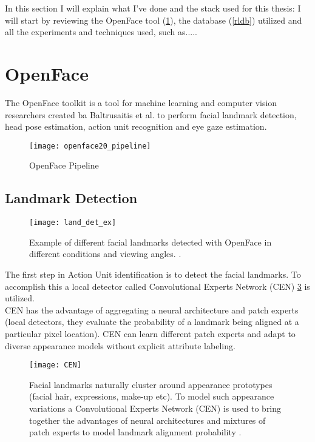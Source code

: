 In this section I will explain what I've done and the stack used for this thesis: I will start by reviewing the OpenFace tool (\ref{OpenFace}), the database (\ref{rldb}) utilized and all the experiments and techniques used, such as.....



\section{OpenFace} \label{OpenFace}
The OpenFace \cite{Baltru2018} toolkit is a tool for machine learning and computer vision researchers created ba Baltrusaitis et al. to perform facial landmark detection, head pose estimation, action unit recognition and eye gaze estimation.

\begin{figure}[H]
	\centering
	\texttt{[image: openface20\_pipeline]}
	\caption{OpenFace Pipeline \cite{Baltru2018}}
	\label{fig:openface20_pipeline}
\end{figure}

\subsection{Landmark Detection}

\begin{figure}[H]
	\centering
	\texttt{[image: land\_det\_ex]}
	\caption{Example of different facial landmarks detected with OpenFace in different conditions and viewing angles. \cite{Baltru2018}.}
	\label{fig:land_det_ex}
\end{figure}

The first step in Action Unit identification is to detect the facial landmarks. To accomplish this a local detector called Convolutional Experts Network (CEN) \ref{fig:CEN} is utilized. \\
CEN has the advantage of aggregating a neural architecture and patch experts (local detectors, they evaluate the probability of a landmark being aligned at a particular pixel location). CEN can learn different patch experts and adapt to diverse appearance models without explicit attribute labeling.

\begin{figure}[H]
	\centering
	\texttt{[image: CEN]}
	\caption{Facial landmarks naturally cluster around appearance prototypes (facial hair, expressions, make-up etc). To model such appearance variations a Convolutional Experts Network (CEN) is used to bring together the advantages of neural architectures and mixtures of patch experts to model landmark alignment probability \cite{Baltru2017}.}
	\label{fig:CEN}
\end{figure}

